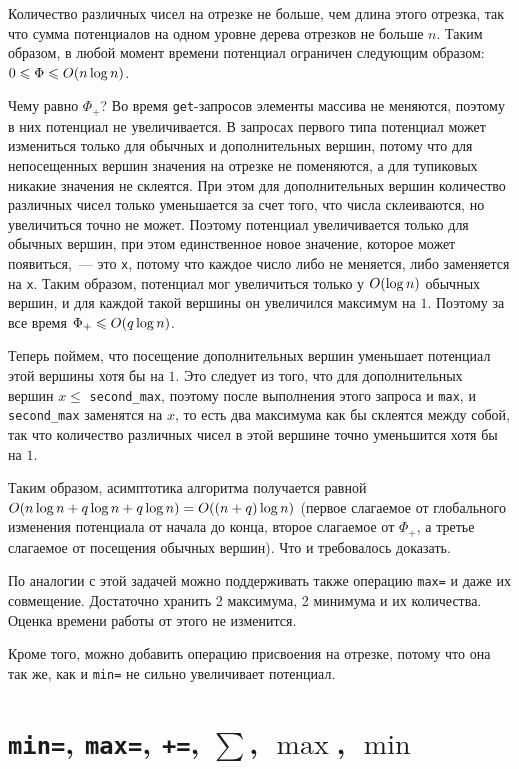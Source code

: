 Количество различных чисел на отрезке не больше, чем длина этого отрезка, так что сумма потенциалов на одном уровне дерева отрезков не больше $n$. Таким образом, в любой момент времени потенциал ограничен следующим образом: $0 \leqslant \Phi \leqslant O(n \log n)$.

Чему равно $\Phi_+$? Во время \verb+get+-запросов элементы массива не меняются, поэтому в них потенциал не увеличивается. В запросах первого типа потенциал может измениться только для обычных и дополнительных вершин, потому что для непосещенных вершин значения на отрезке не поменяются, а для тупиковых никакие значения не склеятся. При этом для дополнительных вершин количество различных чисел только уменьшается за счет того, что числа склеиваются, но увеличиться точно не может. Поэтому потенциал увеличивается только для обычных вершин, при этом единственное новое значение, которое может появиться,~--- это \verb+x+, потому что каждое число либо не меняется, либо заменяется на \verb+x+. Таким образом, потенциал мог увеличиться только у $O(\log n)$ обычных вершин, и для каждой такой вершины он увеличился максимум на $1$. Поэтому за все время $\Phi_+ \leqslant O(q \log n)$.

Теперь поймем, что посещение дополнительных вершин уменьшает потенциал этой вершины хотя бы на $1$. Это следует из того, что для дополнительных вершин $x \le $ \verb+second_max+, поэтому после выполнения этого запроса и \verb+max+, и \verb+second_max+ заменятся на $x$, то есть два максимума как бы склеятся между собой, так что количество различных чисел в этой вершине точно уменьшится хотя бы на $1$.

Таким образом, асимптотика алгоритма получается равной $O(n \log n + q \log n + q \log n) = O((n + q) \log n)$ (первое слагаемое от глобального изменения потенциала от начала до конца, второе слагаемое от $\Phi_+$, а третье слагаемое от посещения обычных вершин). Что и требовалось доказать.

\begin{observation} \label{segment tree beats: ji driver observation}
По аналогии с этой задачей можно поддерживать также операцию \verb+max=+ и даже их совмещение. Достаточно хранить 2 максимума, 2 минимума и их количества. Оценка времени работы от этого не изменится.

Кроме того, можно добавить операцию присвоения на отрезке, потому что она так же, как и \verb+min=+ не сильно увеличивает потенциал.
\end{observation}


\cprotect \section{\verb+min=+, \verb+max=+, \verb^+=^, $\sum$, $\max$, $\min$}

